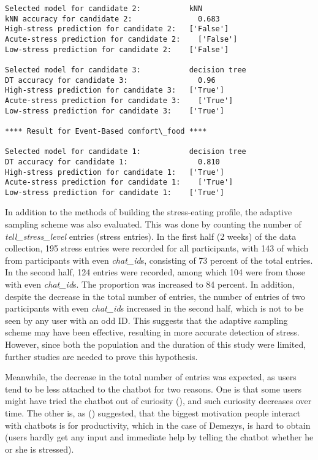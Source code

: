 \begin{lstlisting}[label={model-selection},caption={Result of model selection and prediction for each task},captionpos=b]
Selected model for candidate 2:           kNN
kNN accuracy for candidate 2:	            0.683
High-stress prediction for candidate 2:	  ['False']
Acute-stress prediction for candidate 2:	['False']
Low-stress prediction for candidate 2:	  ['False']

Selected model for candidate 3:           decision tree
DT accuracy for candidate 3:	            0.96
High-stress prediction for candidate 3:	  ['True']
Acute-stress prediction for candidate 3:	['True']
Low-stress prediction for candidate 3:	  ['True']

**** Result for Event-Based comfort\_food ****

Selected model for candidate 1:           decision tree
DT accuracy for candidate 1:	            0.810
High-stress prediction for candidate 1:	  ['True']
Acute-stress prediction for candidate 1:	['True']
Low-stress prediction for candidate 1:	  ['True']
\end{lstlisting}

\bigskip
In addition to the methods of building the stress-eating profile, the adaptive sampling scheme was also evaluated. This was done by counting the number of \emph{tell\_stress\_level} entries (stress entries). In the first half (2 weeks) of the data collection, 195 stress entries were recorded for all participants, with 143 of which from participants with even \emph{chat\_id}s, consisting of 73 percent of the total entries. In the second half, 124 entries were recorded, among which 104 were from those with even \emph{chat\_id}s. The proportion was increased to 84 percent. In addition, despite the decrease in the total number of entries, the number of entries of two participants with even \emph{chat\_id}s increased in the second half, which is not to be seen by any user with an odd ID. This suggests that the adaptive sampling scheme may have been effective, resulting in more accurate detection of stress. However, since both the population and the duration of this study were limited, further studies are needed to prove this hypothesis.

Meanwhile, the decrease in the total number of entries was expected, as users tend to be less attached to the chatbot for two reasons. One is that some users might have tried the chatbot out of curiosity (\cite{47_curiosity}), and such curiosity decreases over time. The other is, as \citeauthor{48_why_chatbot} (\citeyear{48_why_chatbot}) suggested, that the biggest motivation people interact with chatbots is for productivity, which in the case of Demezys, is hard to obtain (users hardly get any input and immediate help by telling the chatbot whether he or she is stressed).
